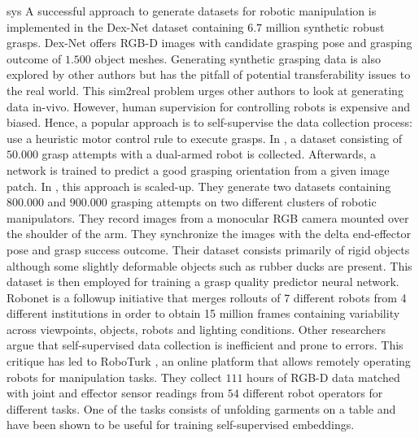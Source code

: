 \documentclass[\home/main.tex]{subfiles}
\begin{document}
sys
A successful approach to generate datasets for robotic manipulation is implemented in the Dex-Net \autocite{dexnet2} dataset containing $6.7$ million synthetic robust grasps. Dex-Net offers RGB-D images with candidate grasping pose and grasping outcome of $1.500$ object meshes. Generating synthetic grasping data is also explored by other authors \autocite{depierre2018jacquard,redmon2015real} but has the pitfall of potential transferability issues to the real world. This sim2real problem urges other authors to look at generating data in-vivo. However, human supervision for controlling robots is expensive and biased. Hence, a popular approach is to self-supervise the data collection process: use a heuristic motor control rule to execute grasps. In \autocite{pinto2016supersizing}, a dataset consisting of $50.000$ grasp attempts with a dual-armed robot is collected. Afterwards, a network is trained to predict a good grasping orientation from a given image patch.
In \autocite{Levine2016}, this approach is scaled-up. They generate two datasets containing $800.000$ and $900.000$ grasping attempts on two different clusters of robotic manipulators. They record images from a monocular RGB camera mounted over the shoulder of the arm. They synchronize the images with the delta end-effector pose and grasp success outcome. Their dataset consists primarily of rigid objects although some slightly deformable objects such as rubber ducks are present. This dataset is then employed for training a grasp quality predictor neural network.
Robonet \autocite{dasari2019robonet} is a followup initiative that merges rollouts of 7 different robots from 4 different institutions in order to obtain 15 million frames containing variability across viewpoints, objects, robots and lighting conditions.
Other researchers \autocite{mandlekar2018roboturk} argue that self-supervised data collection is inefficient and prone to errors. This critique has led to RoboTurk \autocite{mandlekar2018roboturk}, an online platform that allows remotely operating robots for manipulation tasks. They collect $111$ hours of RGB-D data matched with joint and effector sensor readings from $54$ different robot operators for different tasks. One of the tasks consists of unfolding garments on a table and have been shown to be useful for training self-supervised embeddings.
\end{document}
